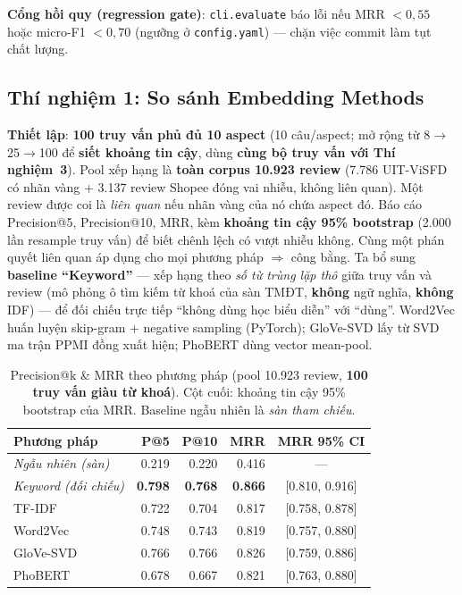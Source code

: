 \documentclass[12pt,a4paper]{article}
\begin{document}
\noindent\textbf{Cổng hồi quy (regression gate)}: \texttt{cli.evaluate} báo lỗi nếu MRR $<0{,}55$ hoặc micro-F1 $<0{,}70$ (ngưỡng ở \texttt{config.yaml}) --- chặn việc commit làm tụt chất lượng.

\subsection{Thí nghiệm 1: So sánh Embedding Methods}
\label{sec:exp1}

\textbf{Thiết lập}: \textbf{100 truy vấn phủ đủ 10 aspect} (10 câu/aspect; mở rộng từ 8$\to$25$\to$100 để \textbf{siết khoảng tin cậy}, dùng \textbf{cùng bộ truy vấn với Thí nghiệm~3}). Pool xếp hạng là \textbf{toàn corpus 10.923 review} (7.786 UIT-ViSFD có nhãn vàng + 3.137 review Shopee đóng vai nhiễu, không liên quan). Một review được coi là \textit{liên quan} nếu nhãn vàng của nó chứa aspect đó. Báo cáo Precision@5, Precision@10, MRR, kèm \textbf{khoảng tin cậy 95\% bootstrap} (2.000 lần resample truy vấn) để biết chênh lệch có vượt nhiễu không. Cùng một phán quyết liên quan áp dụng cho mọi phương pháp $\Rightarrow$ công bằng. Ta bổ sung \textbf{baseline ``Keyword''} --- xếp hạng theo \textit{số từ trùng lặp thô} giữa truy vấn và review (mô phỏng ô tìm kiếm từ khoá của sàn TMĐT, \textbf{không} ngữ nghĩa, \textbf{không} IDF) --- để đối chiếu trực tiếp ``không dùng học biểu diễn'' với ``dùng''. Word2Vec huấn luyện skip-gram + negative sampling (PyTorch); GloVe-SVD lấy từ SVD ma trận PPMI đồng xuất hiện; PhoBERT dùng vector mean-pool.

\begin{table}[H]
\centering
\caption{Precision@k \& MRR theo phương pháp (pool 10.923 review, \textbf{100 truy vấn giàu từ khoá}). Cột cuối: khoảng tin cậy 95\% bootstrap của MRR. Baseline ngẫu nhiên là \textit{sàn tham chiếu}.}
\begin{tabular}{lrrrc}
\toprule
\textbf{Phương pháp} & \textbf{P@5} & \textbf{P@10} & \textbf{MRR} & \textbf{MRR 95\% CI} \\
\midrule
\textit{Ngẫu nhiên (sàn)} & 0.219 & 0.220 & 0.416 & --- \\
\textit{Keyword (đối chiếu)} & \textbf{0.798} & \textbf{0.768} & \textbf{0.866} & [0.810, 0.916] \\
TF-IDF     & 0.722 & 0.704 & 0.817 & [0.758, 0.878] \\
Word2Vec   & 0.748 & 0.743 & 0.819 & [0.757, 0.880] \\
GloVe-SVD  & 0.766 & 0.766 & 0.826 & [0.759, 0.886] \\
PhoBERT    & 0.678 & 0.667 & 0.821 & [0.763, 0.880] \\
\bottomrule
\end{tabular}
\end{table}
\end{document}
